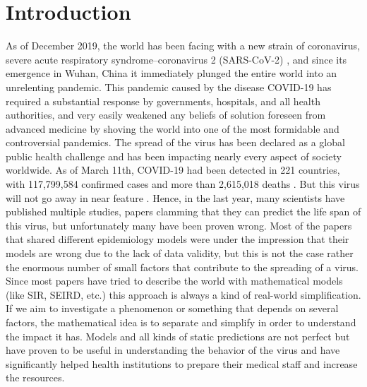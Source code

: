 \documentclass[conference,compsoc]{IEEEtran}
\begin{document}
\section{Introduction}
As of December 2019, the world has been facing with a new strain of coronavirus, severe acute respiratory syndrome–coronavirus 2 (SARS-CoV-2) \cite{ref1}, and since its emergence in Wuhan, China it immediately plunged the entire world into an unrelenting pandemic. This pandemic caused by the disease COVID-19 has required a substantial response by governments, hospitals, and all health authorities, and very easily weakened any beliefs of solution foreseen from advanced medicine by shoving the world into one of the most formidable and controversial pandemics. The spread of the virus has been declared as a global public health challenge and has been impacting nearly every aspect of society worldwide. As of March 11th, COVID-19 had been detected in 221 countries, with 117,799,584 confirmed cases and more than 2,615,018 deaths \cite{ref2}. 
\hspace{0pt}
But this virus will not go away in near feature \cite{ref3}. Hence, in the last year, many scientists have published multiple studies, papers clamming that they can predict the life span of this virus, but unfortunately many have been proven wrong. Most of the papers that shared different epidemiology models were under the impression that their models are wrong due to the lack of data validity, but this is not the case rather the enormous number of small factors that contribute to the spreading of a virus. Since most papers have tried to describe the world with mathematical models \cite{ref4} (like SIR, SEIRD, etc.) this approach is always a kind of real-world simplification. If we aim to investigate a phenomenon or something that depends on several factors, the mathematical idea is to separate and simplify in order to understand the impact it has. Models and all kinds of static predictions are not perfect but have proven to be useful in understanding the behavior of the virus and have significantly helped health institutions to prepare their medical staff and increase the resources. 
\end{document}
